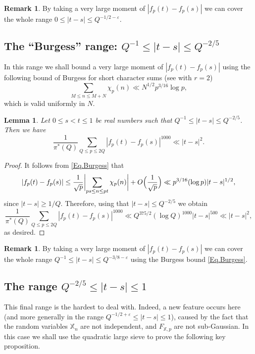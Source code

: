 \documentclass[10pt]{amsart}
\theoremstyle{plain}
\newtheorem{lem}[thm]{Lemma}
\theoremstyle{definition}
\newtheorem{rem}[thm]{Remark}
\let\ep\varepsilon
\newcommand{\X}{\mathbb{X}}
\begin{document}
\begin{rem}\label{Rem.Trivial}
By taking a very large moment of $|f_p(t)-f_p(s)|$ we can cover the whole range $0 \leq |t-s|\leq Q^{-1/2-\ep}$.
\end{rem}

\subsection{The ``Burgess'' range: $Q^{-1} \leq |t-s|\leq Q^{-2/5}$} In this range we shall bound a very large moment of $|f_p(t)-f_p(s)|$ using the following bound of Burgess for short character sums (see \cite[Th.\,1]{Bu} with $r=2$)
\begin{equation}\label{Eq.Burgess}
\sum_{M\leq n\leq M+N} \chi_p(n) \ll N^{1/2} p^{3/16}\log p,
\end{equation}
which is valid uniformly in $N$.
\begin{lem}\label{SecondRangeTSLemma}
Let $0\leq s<t\leq 1$ be real numbers such that $Q^{-1}\leq |t-s|\leq Q^{-2/5}$. Then we have
\[
\frac{1}{\pi^*(Q)}\sum_{Q\leq p\leq 2Q} |f_p(t)-f_p(s)|^{1000} \ll |t-s|^2.
\]
\end{lem}

\begin{proof}
It follows from \eqref{Eq.Burgess} that
\[
|f_p(t) - f_p(s)| \leq \frac{1}{\sqrt{p}}\biggl|\sum_{ps\leq n\leq pt} \chi_p(n)\biggr| +O\Bigl(\frac{1}{\sqrt{p}}\Bigr) \ll p^{3/16} (\log p) |t-s|^{1/2},\]
since $ |t-s|\geq 1/Q$.
Therefore, using that $|t-s|\leq Q^{-2/5}$ we obtain
\[
\frac{1}{\pi^*(Q)}\sum_{Q\leq p\leq 2Q} |f_p(t)-f_p(s)|^{1000} \ll Q^{375/2} (\log Q)^{1000} |t-s|^{500} \ll |t-s|^2,\]
as desired.
\end{proof}
\begin{rem}\label{Rem.Burgess}
By taking a very large moment of $|f_p(t)-f_p(s)|$ we can cover the whole range $Q^{-1} \leq |t-s|\leq Q^{-3/8-\ep}$ using the Burgess bound \eqref{Eq.Burgess}.
\end{rem}

\subsection{The range $Q^{-2/5}\leq |t-s|\leq 1$} This final range is the hardest to deal with. Indeed, a new feature occurs here (and more generally in the range \hbox{$Q^{-1/2+\varepsilon}\!\leq\! |t-s|\!\leq\!1$}), caused by the fact that the random variables $\X_n$ are not independent, and $F_{\X,p}$ are not sub-Gaussian. In this case we shall use the quadratic large sieve to prove the following key proposition.
\end{document}
